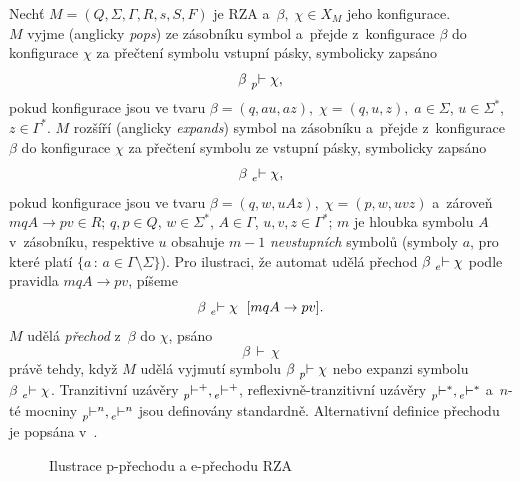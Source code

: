 \begin{definition}\label{def_prechod_rza}
    Nechť $M = (Q, \Sigma, \Gamma, R, s, S, F)$ je RZA a~$\beta,\; \chi \in X_M$ jeho konfigurace.\\
    $M$ vyjme (anglicky \emph{pops}) ze zásobníku symbol a~přejde z~konfigurace $\beta$ do konfigurace $\chi$ za přečtení symbolu vstupní pásky, symbolicky zapsáno
    \begin{equation*}
        \beta\, \prescript{}{p}{\vdash}\; \chi,
    \end{equation*}
    pokud konfigurace jsou ve tvaru $\beta = (q, au, az),\; \chi = (q, u, z),\; a \in \Sigma$, $u \in \Sigma^*$, ${z \in \Gamma^*}$.
    $M$ rozšíří (anglicky \emph{expands}) symbol na zásobníku a~přejde z~konfigurace $\beta$ do konfigurace $\chi$ za přečtení symbolu ze vstupní pásky, symbolicky zapsáno
    \begin{equation*}
        \beta\, \prescript{}{e}{\vdash}\; \chi,
    \end{equation*} 
    pokud konfigurace jsou ve tvaru $\beta = (q, w, uAz),\; \chi = (p, w, uvz)$ a~zároveň $mqA \rightarrow pv \in R$; $q, p \in Q$, $w \in \Sigma^*$, $A \in \Gamma$, $u, v, z \in \Gamma^*$; $m$ je hloubka symbolu $A$ v~zásobníku, respektive $u$ obsahuje $m-1$ \emph{nevstupních} symbolů (symboly $a$, pro které platí $\{a\, :\, a \in \Gamma \setminus \Sigma\}$). 
    Pro ilustraci, že automat udělá přechod $\beta\, \prescript{}{e}{\vdash}\; \chi$ podle pravidla $mqA \rightarrow pv$, píšeme
     \begin{equation*}
        \beta\, \prescript{}{e}{\vdash}\; \chi \ \; [mqA \rightarrow pv].
    \end{equation*}
    $M$ udělá \emph{přechod} z~$\beta$ do $\chi$, psáno
    \begin{equation*}
        \beta\, \vdash\, \chi
    \end{equation*}
    právě tehdy, když $M$ udělá vyjmutí symbolu $\beta\, \prescript{}{p}{\vdash}\; \chi$ nebo expanzi symbolu $\beta\, \prescript{}{e}{\vdash}\; \chi$.
    Tranzitivní uzávěry $\prescript{}{p}{\vdash^+}, \prescript{}{e}{\vdash^+}$, reflexivně-tranzitivní uzávěry $\prescript{}{p}{\vdash^*}, \prescript{}{e}{\vdash^*}$ a~$n$-té mocniny $\prescript{}{p}{\vdash^n}, \prescript{}{e}{\vdash^n}$ jsou definovány standardně.
    Alternativní definice přechodu je popsána v~\cite{TIN-opora}.
\end{definition}
\begin{figure}[ht]\label{fig_prechod_rza}
    \caption{Ilustrace p-přechodu a e-přechodu RZA}
\end{figure}

